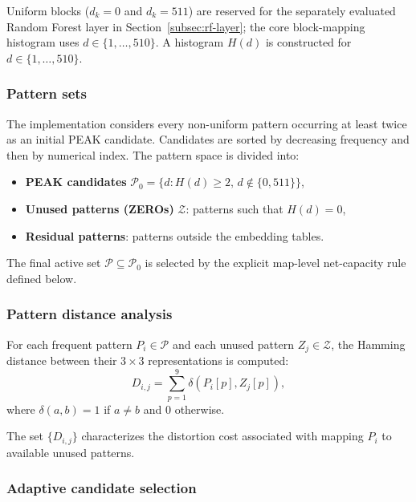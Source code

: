 \documentclass[a4paper,fleqn]{cas-dc}
\newcommand{\RevisionAddBegin}{\begingroup}
\newcommand{\RevisionAddEnd}{\endgroup}
\newcommand{\RevisionAddBegin}{\begingroup\color{revisionblue}}
\newcommand{\RevisionAddEnd}{\endgroup}
\begin{document}
Uniform blocks ($d_k = 0$ and $d_k = 511$) are reserved for the separately
evaluated Random Forest layer in Section~\ref{subsec:rf-layer}; the core
block-mapping histogram uses $d\in\{1,\ldots,510\}$.
A histogram $H(d)$ is constructed for $d \in \{1,\ldots,510\}$.

\subsubsection*{Pattern sets}

The implementation considers every non-uniform pattern occurring at least
twice as an initial PEAK candidate. Candidates are sorted by decreasing
frequency and then by numerical index. The pattern space is divided into:
\begin{itemize}
    \item \textbf{PEAK candidates} $\mathcal{P}_0=\{d:H(d)\geq2,\,
    d\notin\{0,511\}\}$,
    \item \textbf{Unused patterns (ZEROs)} $\mathcal{Z}$: patterns such that $H(d)=0$,
\RevisionAddBegin
    \item \textbf{Residual patterns}: patterns outside the embedding tables.
\RevisionAddEnd
\end{itemize}

The final active set $\mathcal{P}\subseteq\mathcal{P}_0$ is selected by the
\RevisionAddBegin
explicit map-level net-capacity rule defined below.
\RevisionAddEnd

\subsubsection*{Pattern distance analysis}

For each frequent pattern $P_i \in \mathcal{P}$ and each unused pattern $Z_j \in \mathcal{Z}$,
the Hamming distance between their $3 \times 3$ representations is computed:
\begin{equation}
D_{i,j} = \sum_{p=1}^{9} \delta(P_i[p], Z_j[p]),
\label{eq:hamming-distance}
\end{equation}
where $\delta(a,b)=1$ if $a\neq b$ and $0$ otherwise.

The set $\{D_{i,j}\}$ characterizes the distortion cost associated with mapping $P_i$ to available unused patterns.

\subsubsection*{Adaptive candidate selection}
\end{document}
